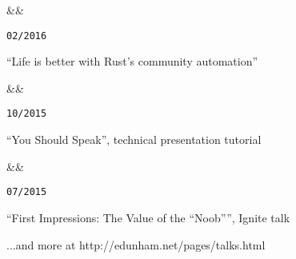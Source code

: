 \documentclass[11pt]{article} %
\newcommand{\squish}{
    \setlength{\itemsep}{0.5pt}
    \setlength{\parskip}{0pt} %
    \setlength{\parsep}{0.5pt}
}
\newcommand{\when}[1]{ %
    \hfill \texttt{#1}
}
\newcommand{\experience}[3]{ %
    \ifx&#2&
        \item[{#1}]
    \else
        \item[{#1}, \emph{#2}]
    \fi
    \when{#3}
}
\begin{document}
\begin{description}
\squish

\experience{Linux.Conf.Au}
           {}
           {02/2016}

    ``Life is better with Rust's community automation''

\experience{SeaGL}
           {}
           {10/2015}

    ``You Should Speak'', technical presentation tutorial

\experience{O'Reilly OSCON}
           {}
           {07/2015}

    ``First Impressions: The Value of the ``Noob'''', Ignite talk

%

%

%

%

%

%

%

\hfill \small ...and more at http://edunham.net/pages/talks.html

\end{description}
\end{document}
